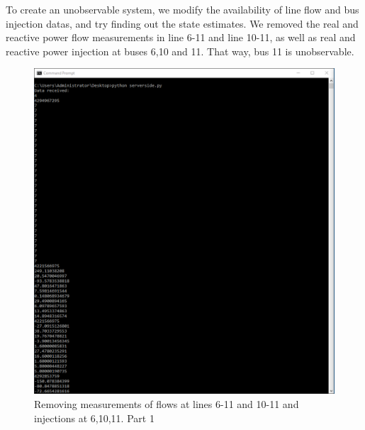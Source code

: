 To create an unobservable system, we modify the availability of line flow and bus injection datas, and try finding out the state estimates. We removed the real and reactive power flow measurements in line 6-11 and line 10-11, as well as real and reactive power injection at buses 6,10 and 11. That way, bus 11 is unobservable.
\begin{figure}
\includegraphics[width=\textwidth]{Figures/unobs_1.png}
\caption{Removing measurements of flows at lines 6-11 and 10-11 and injections at 6,10,11. Part 1}
\label{fig:unobs1}
\end{figure}
